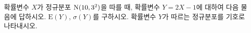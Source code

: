 확률변수 $X$가 정규분포 $\mathrm{N}(10{,}\mkern3mu\mathopen{}3^2)$을 따를 때, 확률변수 $Y=2X-1$에 대하여 다음 물음에 답하시오.
 $\mathrm{E}(Y)$, $\sigma(Y)$를 구하시오.
 확률변수 $Y$가 따르는 정규분포를 기호로 나타내시오.
